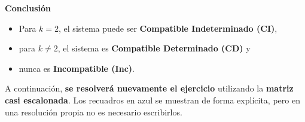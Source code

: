 \documentclass[11pt]{article}
\begin{document}
\begin{enumerate}[\hspace{-5mm} 1) ]
\begin{enumerate}[a)]
\begin{minipage}{.75\textwidth}
    
\end{minipage}


\textbf{Conclusión}
\begin{itemize}
    \item Para \(k = 2\), el sistema puede ser \textbf{Compatible Indeterminado (CI)},
    \item para \(k \neq 2\), el sistema es \textbf{Compatible Determinado (CD)} y 
    \item nunca es  \textbf{Incompatible (Inc)}.
\end{itemize}







\bigskip







A continuación, {\bf se resolverá nuevamente el ejercicio} utilizando la {\bf matriz casi escalonada}. Los recuadros en azul se muestran de forma explícita, pero en una resolución propia no es necesario escribirlos. 


\end{enumerate}
\end{enumerate}
\end{document}

